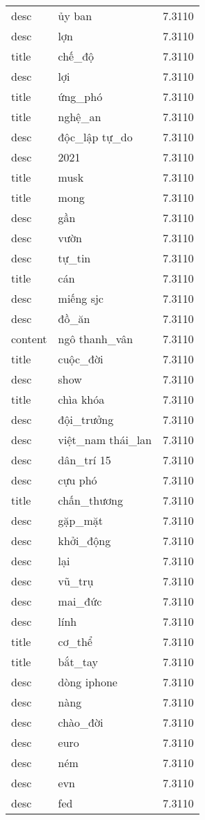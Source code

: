 \documentclass{article}
\begin{document}
\begin{tabular}{lll}
desc & ủy ban & 7.3110\\
desc & lợn & 7.3110\\
title & chế\_độ & 7.3110\\
desc & lợi & 7.3110\\
title & ứng\_phó & 7.3110\\
title & nghệ\_an & 7.3110\\
desc & độc\_lập tự\_do & 7.3110\\
desc & 2021 & 7.3110\\
title & musk & 7.3110\\
title & mong & 7.3110\\
desc & gần & 7.3110\\
desc & vườn & 7.3110\\
desc & tự\_tin & 7.3110\\
title & cán & 7.3110\\
desc & miếng sjc & 7.3110\\
desc & đồ\_ăn & 7.3110\\
content & ngô thanh\_vân & 7.3110\\
title & cuộc\_đời & 7.3110\\
desc & show & 7.3110\\
title & chìa khóa & 7.3110\\
desc & đội\_trưởng & 7.3110\\
desc & việt\_nam thái\_lan & 7.3110\\
desc & dân\_trí 15 & 7.3110\\
desc & cựu phó & 7.3110\\
title & chấn\_thương & 7.3110\\
desc & gặp\_mặt & 7.3110\\
desc & khởi\_động & 7.3110\\
desc & lại & 7.3110\\
desc & vũ\_trụ & 7.3110\\
desc & mai\_đức & 7.3110\\
desc & lính & 7.3110\\
title & cơ\_thể & 7.3110\\
title & bắt\_tay & 7.3110\\
desc & dòng iphone & 7.3110\\
desc & nàng & 7.3110\\
desc & chào\_đời & 7.3110\\
desc & euro & 7.3110\\
desc & ném & 7.3110\\
desc & evn & 7.3110\\
desc & fed & 7.3110\\

\end{tabular}
\end{document}
